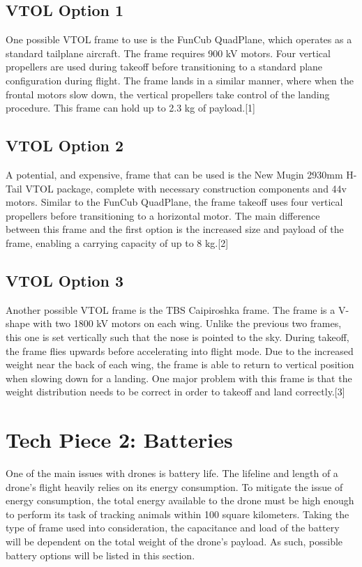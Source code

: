 \documentclass[onecolumn, draftclsnofoot,10pt, compsoc]{IEEEtran}
\begin{document}
\subsection{VTOL Option 1}
One possible VTOL frame to use is the FunCub QuadPlane, which operates as a standard tailplane aircraft. The frame requires 900 kV motors. Four vertical propellers are used during takeoff before transitioning to a standard plane configuration during flight. The frame lands in a similar manner, where when the frontal motors slow down, the vertical propellers take control of the landing procedure. This frame can hold up to 2.3 kg of payload.[1]
\subsection{VTOL Option 2}
A potential, and expensive, frame that can be used is the New Mugin 2930mm H-Tail VTOL package, complete with necessary construction components and 44v motors. Similar to the FunCub QuadPlane, the frame takeoff uses four vertical propellers before transitioning to a horizontal motor. The main difference between this frame and the first option is the increased size and payload of the frame, enabling a carrying capacity of up to 8 kg.[2]
\subsection{VTOL Option 3}
Another possible VTOL frame is the TBS Caipiroshka frame. The frame is a V-shape with two 1800 kV motors on each wing. Unlike the previous two frames, this one is set vertically such that the nose is pointed to the sky. During takeoff, the frame flies upwards before accelerating into flight mode. Due to the increased weight near the back of each wing, the frame is able to return to vertical position when slowing down for a landing. One major problem with this frame is that the weight distribution needs to be correct in order to takeoff and land correctly.[3]
\section{Tech Piece 2: Batteries}
One of the main issues with drones is battery life. The lifeline and length of a drone's flight heavily relies on its energy consumption. To mitigate the issue of energy consumption, the total energy available to the drone must be high enough to perform its task of tracking animals within 100 square kilometers. Taking the type of frame used into consideration, the capacitance and load of the battery will be dependent on the total weight of the drone's payload. As such, possible battery options will be listed in this section.
\end{document}
